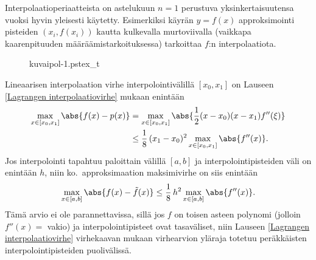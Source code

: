 Interpolaatioperiaatteista on astelukuun $n=1$ perustuva  
yksinkertaisuutensa vuoksi hyvin yleisesti käytetty. Esimerkiksi käyrän $y=f(x)$ approksimointi
pisteiden $(x_i,f(x_i))$ kautta kulkevalla murtoviivalla (vaikkapa kaarenpituuden 
määräämistarkoituksessa) tarkoittaa $f$:n  interpolaatiota.
\begin{figure}[H]
\begin{center}
{kuvaipol-1.pstex_t}
\end{center}
\end{figure}
Lineaarisen interpolaation virhe interpolointivälillä $[x_0,x_1]$ on Lauseen 
\ref{Lagrangen interpolaatiovirhe} mukaan enintään
\begin{align*}
\max_{x\in [x_0,x_1]} \abs{f(x)-p(x)} 
         &= \max_{x\in [x_0,x_1]} \abs{\frac{1}{2}(x-x_0)(x-x_1)f''(\xi)} \\
         &\le \frac{1}{8}\,(x_1-x_0)^2\max_{x\in [x_0,x_1]} \abs{f''(x)}.
\end{align*}
Jos interpolointi tapahtuu paloittain välillä $[a,b]$ ja interpolointipisteiden väli on
enintään $h$, niin ko.\ approksimaation maksimivirhe on siis enintään
\[
\max_{x\in [a,b]} \abs{f(x)-\tilde{f}(x)}\leq\frac{1}{8}\,h^2\max_{x\in [a,b]} \abs{f''(x)}.
\]
Tämä arvio ei ole parannettavissa, sillä jos $f$ on toisen asteen polynomi (jolloin $f''(x)=$ 
vakio) ja interpolointipisteet ovat tasaväliset, niin Lauseen
\ref{Lagrangen interpolaatiovirhe} virhekaavan mukaan virhearvion yläraja totetuu
peräkkäisten interpolointipisteiden puolivälissä.

